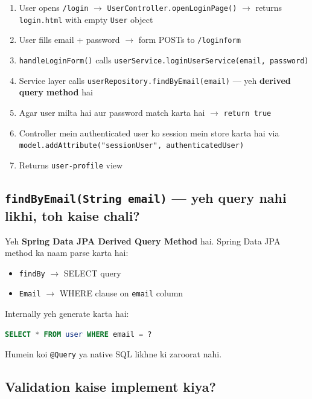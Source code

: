\documentclass[12pt,a4paper]{article}
\begin{document}
\begin{answerbox}
\begin{enumerate}
    \item User opens \texttt{/login} $\rightarrow$ \texttt{UserController.openLoginPage()} $\rightarrow$ returns \texttt{login.html} with empty \texttt{User} object
    \item User fills email + password $\rightarrow$ form POSTs to \texttt{/loginform}
    \item \texttt{handleLoginForm()} calls \texttt{userService.loginUserService(email, password)}
    \item Service layer calls \texttt{userRepository.findByEmail(email)} --- yeh \textbf{derived query method} hai
    \item Agar user milta hai aur password match karta hai $\rightarrow$ \texttt{return true}
    \item Controller mein authenticated user ko session mein store karta hai via \texttt{model.addAttribute("sessionUser", authenticatedUser)}
    \item Returns \texttt{user-profile} view
\end{enumerate}
\end{answerbox}

\subsection{\texttt{findByEmail(String email)} --- yeh query nahi likhi, toh kaise chali?}

\begin{answerbox}
Yeh \textbf{Spring Data JPA Derived Query Method} hai. Spring Data JPA method ka naam parse karta hai:
\begin{itemize}
    \item \texttt{findBy} $\rightarrow$ SELECT query
    \item \texttt{Email} $\rightarrow$ WHERE clause on \texttt{email} column
\end{itemize}
Internally yeh generate karta hai:
\begin{lstlisting}[language=SQL]
SELECT * FROM user WHERE email = ?
\end{lstlisting}
Humein koi \texttt{@Query} ya native SQL likhne ki zaroorat nahi.
\end{answerbox}

\subsection{Validation kaise implement kiya?}
\end{document}
